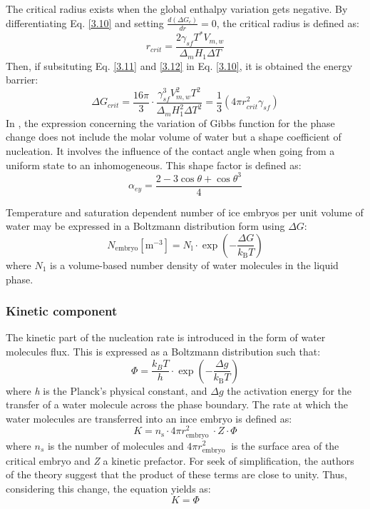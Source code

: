 The critical radius exists when the global enthalpy variation gets negative.
\newline
By differentiating Eq. \ref{3.10} and setting $\frac{d(\Delta G_c)}{dr} = 0$, the critical radius is defined as:
\begin{equation}
\label{2.19}
r_{c r i t}=\frac{2 \gamma_{s f} T^{*} V_{m, w}}{\Delta_{m} H_{1} \Delta T}
\end{equation}
Then, if subsituting Eq. \ref{3.11} and \ref{3.12} in Eq. \ref{3.10}, it is obtained the energy barrier:
\begin{equation}
\label{2.20}
\Delta G_{c r i t}=\frac{16 \pi}{3} \cdot \frac{\gamma_{s f}^{3} V_{m, w}^{2} T^{2}}{\Delta_{m} H_{1}^{2} \Delta T^{2}}=\frac{1}{3}\left(4 \pi r_{c r i t}^{2} \gamma_{s f}\right)
\end{equation}
In \cite{huang_wang_li_2020}, the expression concerning the variation of Gibbs function for the phase change does not include the molar volume of water but a shape coefficient of nucleation. It involves the influence of the contact angle when going from a uniform state to an inhomogeneous. This shape factor is defined as:
\begin{equation}
\label{2.21}
\alpha_{e y}=\frac{2-3 \cos \theta+\cos \theta^{3}}{4}
\end{equation}

Temperature and saturation dependent number of ice embryos per unit volume of water may be expressed in a Boltzmann distribution form using $\Delta G$:
\begin{equation}
\label{2.22}
N_{\mathrm{embryo}}\left[\mathrm{m}^{-3}\right]=N_{\mathrm{l}} \cdot \exp \left(-\frac{\Delta G}{k_{\mathrm{B}} T}\right)
\end{equation}
where $N_{1}$ is a volume-based number density of water molecules in the liquid phase.
\subsubsection*{Kinetic component}
The kinetic part of the nucleation rate is introduced in the form of water molecules flux. This is expressed as a Boltzmann distribution such that:
\begin{equation}
\label{2.23}
\Phi=\frac{k_{B} T}{h} \cdot \exp \left(-\frac{\Delta g}{k_{\mathrm{B}} T}\right)
\end{equation}
where \textit{h} is the Planck's physical constant, and $\Delta g$ the activation energy for the transfer of a water molecule across the phase boundary.
\newline
The rate at which the water molecules are transferred into an ince embryo is defined as:
\begin{equation}
\label{2.24}
K=n_{\mathrm{s}} \cdot 4 \pi r_{\text {embryo }}^{2} \cdot Z \cdot \Phi
\end{equation}
where $n_s$ is the number of molecules and $4 \pi r_{\text {embryo }}^{2}$ is the surface area of the critical embryo and \textit{Z} a kinetic prefactor. For seek of simplification, the authors of the theory suggest that the product of these terms are close to unity. Thus, considering this change, the equation yields as:
\begin{equation}
\label{2.25}
K=\Phi
\end{equation}
